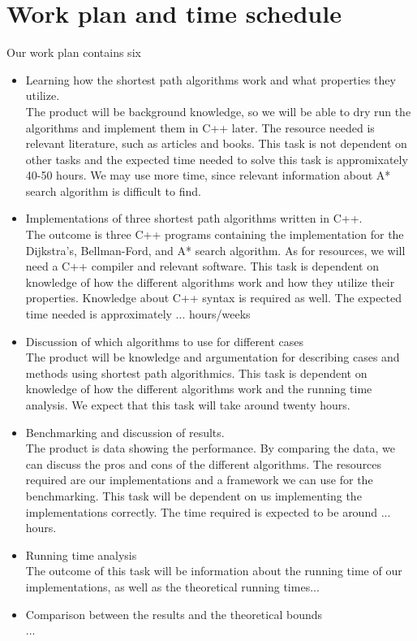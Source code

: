 \documentclass[11pt]{article}
\begin{document}
\section{Work plan and time schedule}
Our work plan contains six 
\begin{itemize}
\item Learning how the shortest path algorithms work and what properties they utilize.\\
The product will be background knowledge, so we will be able to dry run the algorithms and implement them in C++ later. The resource needed is relevant literature, such as articles and books. This task is not dependent on other tasks and the expected time needed to solve this task is appromixately 40-50 hours. We may use more time, since relevant information about A* search algorithm is difficult to find.

\item Implementations of three shortest path algorithms written in C++.\\
The outcome is three C++ programs containing the implementation for the Dijkstra's, Bellman-Ford, and A* search algorithm. As for resources, we will need a C++ compiler and relevant software. This task is dependent on knowledge of how the different algorithms work and how they utilize their properties. Knowledge about C++ syntax is required as well. The expected time needed is approximately ... hours/weeks

\item Discussion of which algorithms to use for different cases\\
The product will be knowledge and argumentation for describing cases and methods using shortest path algorithmics. This task is dependent on knowledge of how the different algorithms work and the running time analysis. We expect that this task will take around twenty hours.

\item Benchmarking and discussion of results.\\
The product is data showing the performance. By comparing the data, we can discuss the pros and cons of the different algorithms. The resources required are our implementations and a framework we can use for the benchmarking. This task will be dependent on us implementing the implementations correctly. The time required is expected to be around ... hours.

\item Running time analysis\\
The outcome of this task will be information about the running time of our implementations, as well as the theoretical running times...

\item Comparison between the results and the theoretical bounds\\
...

\end{itemize}
\end{document}
